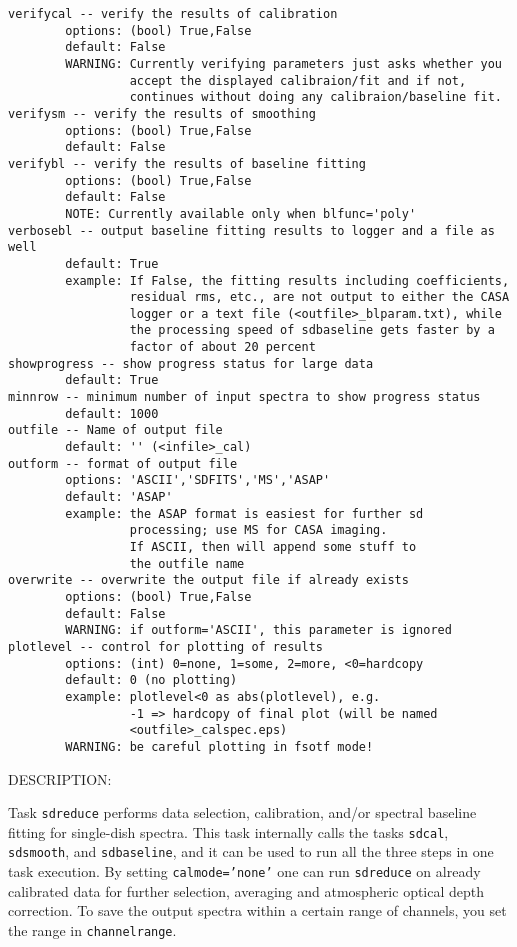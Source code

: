 \begin{verbatim}
verifycal -- verify the results of calibration
        options: (bool) True,False
        default: False
        WARNING: Currently verifying parameters just asks whether you 
                 accept the displayed calibraion/fit and if not, 
                 continues without doing any calibraion/baseline fit.
verifysm -- verify the results of smoothing
        options: (bool) True,False
        default: False
verifybl -- verify the results of baseline fitting
        options: (bool) True,False
        default: False
        NOTE: Currently available only when blfunc='poly'
verbosebl -- output baseline fitting results to logger and a file as well
        default: True
        example: If False, the fitting results including coefficients, 
                 residual rms, etc., are not output to either the CASA 
                 logger or a text file (<outfile>_blparam.txt), while 
                 the processing speed of sdbaseline gets faster by a 
                 factor of about 20 percent
showprogress -- show progress status for large data
        default: True
minnrow -- minimum number of input spectra to show progress status
        default: 1000
outfile -- Name of output file
        default: '' (<infile>_cal)
outform -- format of output file
        options: 'ASCII','SDFITS','MS','ASAP'
        default: 'ASAP'
        example: the ASAP format is easiest for further sd
                 processing; use MS for CASA imaging.
                 If ASCII, then will append some stuff to
                 the outfile name
overwrite -- overwrite the output file if already exists
        options: (bool) True,False
        default: False
        WARNING: if outform='ASCII', this parameter is ignored
plotlevel -- control for plotting of results
        options: (int) 0=none, 1=some, 2=more, <0=hardcopy
        default: 0 (no plotting)
        example: plotlevel<0 as abs(plotlevel), e.g.
                 -1 => hardcopy of final plot (will be named
                 <outfile>_calspec.eps)
        WARNING: be careful plotting in fsotf mode!
\end{verbatim}
    
DESCRIPTION:

Task {\tt sdreduce} performs data selection, calibration, and/or spectral
baseline fitting for single-dish spectra. This task internally calls the
tasks {\tt sdcal}, {\tt sdsmooth}, and {\tt sdbaseline}, and it can be used to run all the
three steps in one task execution.
By setting {\tt calmode='none'}
one can run {\tt sdreduce} on already calibrated data for further selection, averaging and atmospheric optical depth correction. 
To save the output spectra within a certain range of 
channels, you set the range in {\tt channelrange}. 

